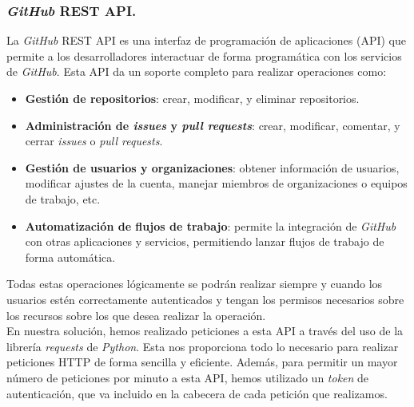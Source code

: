 \subsubsection{\textit{GitHub} REST API.}
La \textit{GitHub} REST API \cite{20} es una interfaz de programación de aplicaciones (API) que permite a
los desarrolladores interactuar de forma programática con los servicios de \textit{GitHub}. Esta
API da un soporte completo para realizar operaciones como:

\begin{itemize}
	\item \textbf{Gestión de repositorios}: crear, modificar, y eliminar repositorios.\\
	\item \textbf{Administración de \textit{issues} y \textit{pull requests}}: crear, modificar, comentar,
    y cerrar \textit{issues} o \textit{pull requests}.\\
	\item \textbf{Gestión de usuarios y organizaciones}: obtener información de usuarios, modificar
    ajustes de la cuenta, manejar miembros de organizaciones o 	equipos de trabajo, etc.\\
	\item \textbf{Automatización de flujos de trabajo}: permite la integración de \textit{GitHub} con otras
    aplicaciones y servicios, permitiendo lanzar flujos de trabajo de forma automática.
\end{itemize}


Todas estas operaciones lógicamente se podrán realizar siempre y cuando los usuarios estén
correctamente autenticados y tengan los permisos necesarios sobre los recursos sobre los que desea
realizar la operación.\\

En nuestra solución, hemos realizado peticiones a esta API a través del uso de la librería
\textit{requests} de \textit{Python}. Esta nos proporciona todo lo necesario para realizar
peticiones HTTP de forma sencilla y eficiente. Además, para permitir un mayor número de peticiones
por minuto a esta API, hemos utilizado un \textit{token} de autenticación, que va incluido en la
cabecera de cada petición que realizamos.\\

